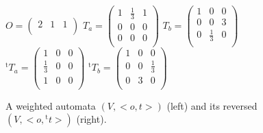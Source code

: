 \documentclass[3p]{elsarticle}
\newcommand{\transp}{{}^{\mathrm{t}}}  %
\begin{document}
\begin{figure}[t]{%
\MediumPicture
%
\begin{center}
\\
\begin{center}
$O= \left(%
\begin{array}{ccc}
  2 & 1 & 1 \\
\end{array}\right)$
$T_{a}=\left(%
\begin{array}{ccc}
  1 & \frac{1}{3} & 1 \\
  0 & 0 & 0 \\
  0 & 0 & 0 \\
\end{array}\right)$
$T_{b}=\left(%
\begin{array}{ccc}
  1 & 0 & 0 \\
  0 & 0 & 3 \\
  0 & \frac{1}{3} & 0 \\
\end{array}\right)$
$\transp{T_{a}}=\left(%
\begin{array}{ccc}
  1 & 0 & 0 \\
  \frac{1}{3} & 0 & 0 \\
  1 & 0 & 0 \\
\end{array}\right)$
$\transp{T_{b}}=\left(%
\begin{array}{ccc}
  1 & 0 & 0 \\
  0 & 0 & \frac{1}{3} \\
  0 & 3 & 0 \\
\end{array}\right)$
\end{center}
 \vspace*{-.5cm}
\end{center}
\caption{A weighted automata $(V,<o,t>)$ (left) and its reversed
$(V,<o,\transp{t}>)$ (right).}\label{fig:ExAlgorithm}
}
\end{figure}
\end{document}

